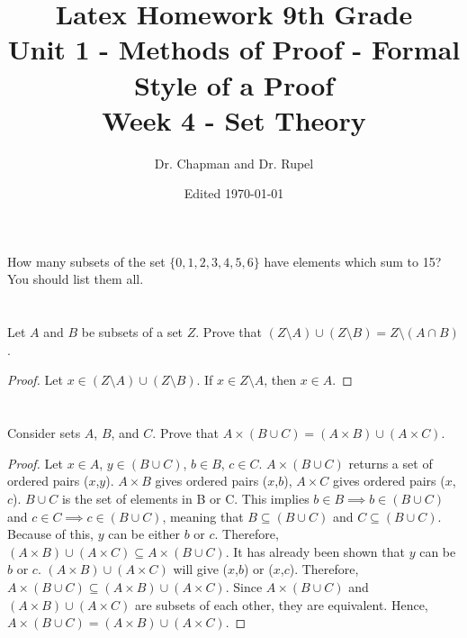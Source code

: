 \documentclass{article}
\title{Latex Homework 9th Grade\\ Unit 1 - Methods of Proof - Formal Style of a Proof\\ Week 4 - Set Theory}
\author{Dr. Chapman and Dr. Rupel}
\date{Edited \today}
\newcommand{\sm}{\setminus}
\begin{document}
\maketitle

\section{}
    How many subsets of the set \(\{0,1,2,3,4,5,6\}\) have elements which sum to 15?
    You should list them all.

\section{}
    Let $A$ and $B$ be subsets of a set $Z$.
    Prove that $(Z\sm A)\cup(Z\sm B)=Z\sm(A\cap B)$.
    \begin{proof}
     Let $x \in (Z\sm A)\cup(Z\sm B)$. If $x\in Z\sm A$, then $x\in A$.
    \end{proof}
\section{}
    Consider sets $A$, $B$, and $C$.
    Prove that $A\times(B\cup C)=(A\times B)\cup(A\times C)$.
	\begin{proof}
	Let $x\in A$, $y\in(B\cup C)$, $b\in B$, $c\in C$. $A\times(B\cup C)$ returns a set of ordered pairs ($x$,$y$). $A\times B$ gives ordered pairs ($x$,$b$), $A\times C$ gives ordered pairs ($x$, $c$). $B\cup C$ is the set of elements in B or C. This implies $b\in B \implies b\in(B\cup C)$ and $c\in C\implies c\in(B\cup C)$, meaning that $B\subseteq (B\cup C)$ and $C\subseteq (B\cup C)$. Because of this, $y$ can be either $b$ or $c$. Therefore, $(A\times B)\cup(A\times C)\subseteq A\times(B\cup C)$. It has already been shown that $y$ can be $b$ or $c$. $(A\times B)\cup(A\times C)$ will give ($x$,$b$) or ($x$,$c$). Therefore, $A\times(B\cup C)\subseteq(A\times B)\cup(A\times C)$. Since $A\times(B\cup C)$ and $(A\times B)\cup(A\times C)$ are subsets of each other, they are equivalent. Hence, $A\times(B\cup C)=(A\times B)\cup(A\times C)$. 
	\end{proof}
\end{document}
